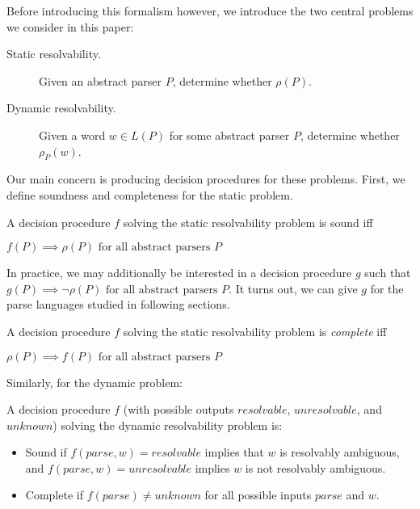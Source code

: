 \documentclass[acmsmall,review,anonymous]{acmart}\settopmatter{printfolios=true,printccs=false,printacmref=false}
\newcommand{\parse}{\mathit{parse}} %
\begin{document}
Before introducing this formalism however, we introduce the two central problems we consider in this paper:

\begin{description}
\item[Static resolvability.] Given an abstract parser $P$, determine whether $\rho(P)$.
\item[Dynamic resolvability.] Given a word $w \in L(P)$ for some abstract parser $P$, determine whether $\rho_P(w)$.
\end{description}

\noindent Our main concern is producing decision procedures for these problems. First, we define soundness and completeness for the static problem.

\begin{definition}\label{def:static-procedure}
  A decision procedure $f$ solving the static resolvability problem is sound iff

  $f(P) \implies \rho(P) \text{ for all abstract parsers } P$
\end{definition}

In practice, we may additionally be interested in a decision procedure
$g$ such that $g(P) \implies \lnot \rho(P) \text{ for all abstract
  parsers } P$. It turns out, we can give $g$ for the parse languages
studied in following sections.

\begin{definition}
  A decision procedure $f$ solving the static resolvability problem is \emph{complete} iff

  $\rho(P) \implies f(P) \text{ for all abstract parsers } P$
\end{definition}


\noindent Similarly, for the dynamic problem:

\begin{definition}
  A decision procedure $f$ (with possible outputs $\mathit{resolvable}$, $\mathit{unresolvable}$, and $\mathit{unknown}$) solving the dynamic resolvability problem is:
  \begin{itemize}
  \item Sound if $f(\parse, w) = \mathit{resolvable}$ implies that $w$ is resolvably ambiguous, and $f(\parse, w) = \mathit{unresolvable}$ implies $w$ is not resolvably ambiguous.
  \item Complete if $f(\parse) \neq \mathit{unknown}$ for all possible inputs $\parse$ and $w$.
  \end{itemize}
  \label{def:dynamic-procedure}
\end{definition}
\end{document}
